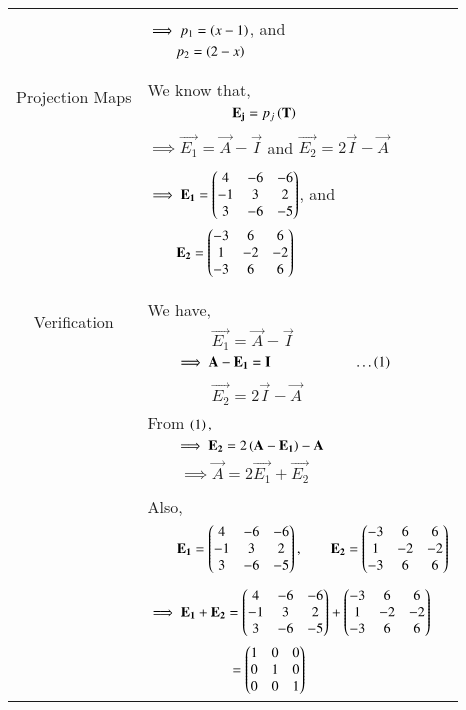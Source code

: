 \documentclass[journal,12pt]{IEEEtran}
\begin{document}
\begin{longtable}{|c|l|}
	&\\
	& $\implies p_1= \left(x-1\right)$, and\\
	&$\qquad p_2=\left(2-x\right)$\\
	&\\
	\hline
	\multirow{3}{*}{Projection Maps} & \\
	& We know that,\\
	&$\qquad \qquad \qquad \mathbf{E_j}=p_j\left(\mathbf{T
	}\right)$\\ 
	&\\
	&$\implies \vec{E_1}=\vec{A}-\vec{I}$ and $\vec{E_2}=2\vec{I}-\vec{A}$ \\
	&\\
	&$\implies \mathbf{E_1}=\begin{pmatrix}4&-6&-6\\-1&3&2\\3&-6&-5\end{pmatrix}$, and \\
	&$\qquad \mathbf{E_2}=\begin{pmatrix}-3&6&6\\1&-2&-2\\-3&6&6\end{pmatrix}$\\
	&\\
	\hline
\multirow{3}{*}{Verification} & \\
	& We have, \\
	&$\qquad\qquad\vec{E_1}=\vec{A}-\vec{I}$\\
	&$\qquad\implies \mathbf{A}-\mathbf{E_1}=\mathbf{I}\qquad\qquad\qquad\dots\left(1\right)$\\
	&\\
	&$\qquad\qquad\vec{E_2}=2\vec{I}-\vec{A}$\\
	&From $\left(1\right),$\\
	&$\qquad\implies\mathbf{E_2}=2\left(\mathbf{A}-\mathbf{E_1}\right)-\mathbf{A}$\\
	&$\qquad\implies \boxed{\vec{A}=2\vec{E_1}+\vec{E_2}}$\\
	&\\
	& Also,\\
	&$\qquad \mathbf{E_1}=\begin{pmatrix}4&-6&-6\\-1&3&2\\3&-6&-5\end{pmatrix},\qquad \mathbf{E_2}=\begin{pmatrix}-3&6&6\\1&-2&-2\\-3&6&6\end{pmatrix}$\\
	&\\
	&$\implies \mathbf{E_1}+\mathbf{E_2}=\begin{pmatrix}4&-6&-6\\-1&3&2\\3&-6&-5\end{pmatrix}+\begin{pmatrix}-3&6&6\\1&-2&-2\\-3&6&6\end{pmatrix}$\\
	&$\qquad\qquad\qquad = \begin{pmatrix}1&0&0\\0&1&0\\0&0&1\end{pmatrix}$\\

\end{longtable}
\end{document}
